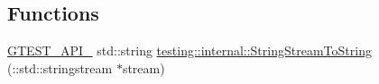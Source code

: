 \subsection*{Functions}
\begin{DoxyCompactItemize}
\item 
\hyperlink{gtest-port_8h_aa73be6f0ba4a7456180a94904ce17790}{G\+T\+E\+S\+T\+\_\+\+A\+P\+I\+\_\+} std\+::string \hyperlink{namespacetesting_1_1internal_ac0a2b7f69fc829d80a39e925b6417e39}{testing\+::internal\+::\+String\+Stream\+To\+String} (\+::std\+::stringstream $\ast$stream)
\end{DoxyCompactItemize}
